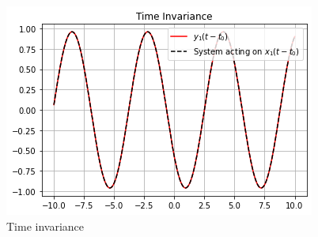 \documentclass[journal,12pt,twocolumn]{IEEEtran}
\begin{document}
  \begin{figure}[!ht]
\centering
 \includegraphics[width=\columnwidth]{graphs/time_invariance.png}
 \caption{Time invariance}
 \end{figure}
\end{document}
